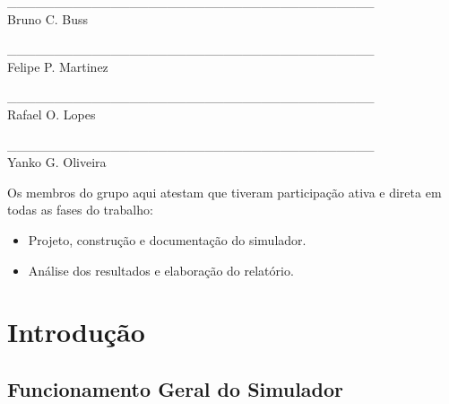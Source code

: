 \documentclass[a4paper,10pt]{article}
\begin{document}
\pagebreak


\begin{center}
\vspace{1cm}

\large

\_\_\_\_\_\_\_\_\_\_\_\_\_\_\_\_\_\_\_\_\_\_\_\_\_\_\_\_\_\_\_\_\_\_\_\_\_\_\_\\
Bruno C. Buss

\vspace{0.5cm}

\_\_\_\_\_\_\_\_\_\_\_\_\_\_\_\_\_\_\_\_\_\_\_\_\_\_\_\_\_\_\_\_\_\_\_\_\_\_\_\\
Felipe P. Martinez

\vspace{0.5cm}

\_\_\_\_\_\_\_\_\_\_\_\_\_\_\_\_\_\_\_\_\_\_\_\_\_\_\_\_\_\_\_\_\_\_\_\_\_\_\_\\
Rafael O. Lopes

\vspace{0.5cm}

\_\_\_\_\_\_\_\_\_\_\_\_\_\_\_\_\_\_\_\_\_\_\_\_\_\_\_\_\_\_\_\_\_\_\_\_\_\_\_\\
Yanko G. Oliveira

\vspace{0.5cm}

\vspace{1cm}

\normalsize
\end{center}

Os membros do grupo aqui atestam que tiveram participação ativa e direta em todas as fases do trabalho:
\begin{itemize}
	\item Projeto, construção e documentação do simulador.
	\item Análise dos resultados e elaboração do relatório.
\end{itemize}


\pagebreak



\tableofcontents
\pagebreak

\listoffigures
\pagebreak

\section{Introdução}
\subsection{Funcionamento Geral do Simulador}
\end{document}
